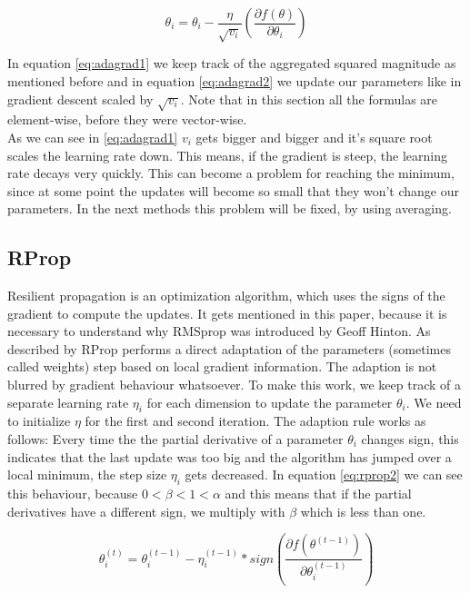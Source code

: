\documentclass[aodsor,preprint]{imsart}
\numberwithin{equation}{section}
\theoremstyle{plain}
\begin{document}
\begin{equation} \label{eq:adagrad2}
\theta_{i} = \theta_{i} - \frac{\eta}{\sqrt{v_{i}}} \left(\frac{\partial f(\theta)}{\partial \theta_{i}} \right)
\end{equation}

In equation \ref{eq:adagrad1} we keep track of the aggregated squared magnitude as mentioned before and in equation \ref{eq:adagrad2} we update our parameters like in gradient descent scaled by $\sqrt{v_{i}}$. Note that in this section all the formulas are element-wise, before they were vector-wise. \\
As we can see in \ref{eq:adagrad1} $v_{i}$ gets bigger and bigger and it's square root scales the learning rate down. This means, if the gradient is steep, the learning rate decays very quickly. This can become a problem for reaching the minimum, since at some point the updates will become so small that they won't change our parameters. In the next methods this problem will be fixed, by using averaging.

\subsection{RProp}
Resilient propagation is an optimization algorithm, which uses the signs of the gradient to compute the updates. It gets mentioned in this paper, because it is necessary to understand why RMSprop was introduced by Geoff Hinton. As described by \cite{RiedmillerM1993Adam} RProp performs a direct adaptation of the parameters (sometimes called weights) step based on local gradient information. The adaption is not blurred by gradient behaviour whatsoever. To make this work, we keep track of a separate learning rate $\eta_{i}$ for each dimension to update the parameter $\theta_{i}$. We need to initialize $\eta$ for the first and second iteration. The adaption rule works as follows: Every time the the partial derivative of a parameter $\theta_{i}$ changes sign, this indicates that the last update was too big and the algorithm has jumped over a local minimum, the step size $\eta_{i}$ gets decreased. In equation \ref{eq:rprop2} we can see this behaviour, because $0<\beta<1<\alpha$ and this means that if the partial derivatives have a different sign, we multiply with $\beta$ which is less than one.

\begin{equation} \label{eq:rprop1}
\theta_{i}^{(t)} = \theta_{i}^{(t-1)} - \eta_{i}^{(t-1)}*sign\left(\frac{\partial f(\theta^{(t-1)})}{\partial \theta_{i}^{(t-1)}} \right)
\end{equation}
\end{document}
